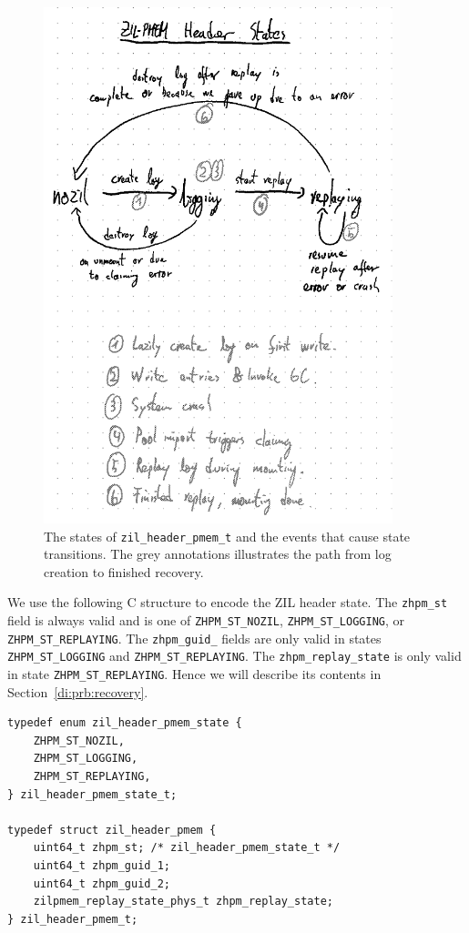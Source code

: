 \documentclass[12pt,a4paper,twoside]{book}
\begin{document}
\begin{figure}
    \includegraphics[height=15cm]{fig/prb_persistent_structure__header_states_plus_example}
    \caption{
        The states of \lstinline{zil_header_pmem_t} and the events that cause state transitions.
        The grey annotations illustrates the path from log creation to finished recovery.}
    \label{fig:prb_persistent_structure__header_states_plus_example}
\end{figure}

We use the following C structure to encode the ZIL header state.
The \lstinline{zhpm_st} field is always valid and is one of \lstinline{ZHPM_ST_NOZIL}, \lstinline{ZHPM_ST_LOGGING}, or \lstinline{ZHPM_ST_REPLAYING}.
The \lstinline{zhpm_guid_} fields are only valid in states \lstinline{ZHPM_ST_LOGGING} and \lstinline{ZHPM_ST_REPLAYING}.
The \lstinline{zhpm_replay_state} is only valid in state \lstinline{ZHPM_ST_REPLAYING}.
Hence we will describe its contents in Section~\ref{di:prb:recovery}.
\begin{lstlisting}
typedef enum zil_header_pmem_state {
    ZHPM_ST_NOZIL,
    ZHPM_ST_LOGGING,
    ZHPM_ST_REPLAYING,
} zil_header_pmem_state_t;

typedef struct zil_header_pmem {
    uint64_t zhpm_st; /* zil_header_pmem_state_t */
    uint64_t zhpm_guid_1;
    uint64_t zhpm_guid_2;
    zilpmem_replay_state_phys_t zhpm_replay_state;
} zil_header_pmem_t;
\end{lstlisting}
\end{document}
